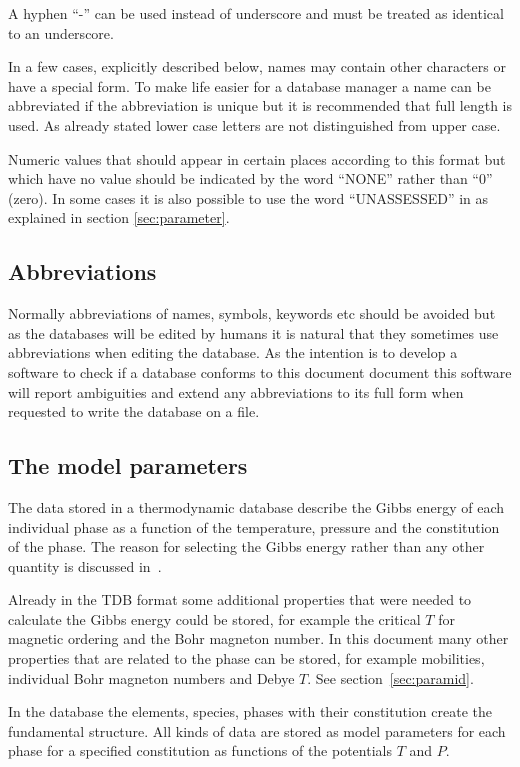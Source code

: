 \documentclass[12pt]{article}
\begin{document}
A hyphen ``-'' can be used instead of underscore and must be treated
as identical to an underscore.

In a few cases, explicitly described below, names may contain other
characters or have a special form.  To make life easier for a database
manager a name can be abbreviated if the abbreviation is unique but it
is recommended that full length is used.  As already stated lower case
letters are not distinguished from upper case.

Numeric values that should appear in certain places according to this
format but which have no value should be indicated by the word
``NONE'' rather than ``0'' (zero).  In some cases it is also possible
to use the word ``UNASSESSED'' in as explained in section
\ref{sec:parameter}.

\subsection{Abbreviations}

Normally abbreviations of names, symbols, keywords etc should be
avoided but as the databases will be edited by humans it is natural
that they sometimes use abbreviations when editing the database.  As
the intention is to develop a software to check if a database conforms
to this document document this software will report ambiguities and
extend any abbreviations to its full form when requested to write the
database on a file.

\subsection{The model parameters}

The data stored in a thermodynamic database describe the Gibbs energy
of each individual phase as a function of the temperature, pressure
and the constitution of the phase.  The reason for selecting the Gibbs
energy rather than any other quantity is discussed in~\cite{78Hil}.

Already in the TDB format some additional properties that were needed
to calculate the Gibbs energy could be stored, for example the
critical $T$ for magnetic ordering and the Bohr magneton number.  In
this document many other properties that are related to the phase can
be stored, for example mobilities, individual Bohr magneton numbers
and Debye $T$.  See section~\ref{sec:paramid}.

In the database the elements, species, phases with their constitution
create the fundamental structure.  All kinds of data are stored as
model parameters for each phase for a specified constitution as
functions of the potentials $T$ and $P$.
\end{document}

